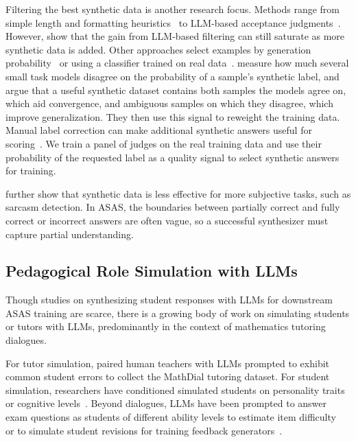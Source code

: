 Filtering the best synthetic data is another research focus. Methods range from simple length and formatting heuristics~\citep{yeZeroGenEfficientZeroshot2022} to LLM-based acceptance judgments~\citep{anikinaRigorousEvaluationLLM2025}. However, \citet{pecherBetterGeneratorsClassifiers2026} show that the gain from LLM-based filtering can still saturate as more synthetic data is added. Other approaches select examples by generation probability~\citep{mengGeneratingTrainingData2022} or using a classifier trained on real data~\citep{anabytavorNotHaveEnough2020}. \citet{zouFuseGenPLMFusion2024} measure how much several small task models disagree on the probability of a sample's synthetic label, and argue that a useful synthetic dataset contains both samples the models agree on, which aid convergence, and ambiguous samples on which they disagree, which improve generalization. They then use this signal to reweight the training data. Manual label correction can make additional synthetic answers useful for scoring~\citep{bexteLunchFreeOvercoming2025}. We train a panel of judges on the real training data and use their probability of the requested label as a quality signal to select synthetic answers for training.

\citet{liSyntheticDataGeneration2023} further show that synthetic data is less effective for more subjective tasks, such as sarcasm detection. In ASAS, the boundaries between partially correct and fully correct or incorrect answers are often vague, so a successful synthesizer must capture partial understanding. 


\subsection{Pedagogical Role Simulation with LLMs} 
Though studies on synthesizing student responses with LLMs for downstream ASAS training are scarce, there is a growing body of work on simulating students or tutors with LLMs, predominantly in the context of mathematics tutoring dialogues.

For tutor simulation, \citet{macinaMathDialDialogueTutoring2023} paired human teachers with LLMs prompted to exhibit common student errors to collect the MathDial tutoring dataset.
For student simulation, researchers have conditioned simulated students on personality traits~\citep{liuPersonalityawareStudentSimulation2025} or cognitive levels~\citep{wuEmbracingImperfectionSimulating2025}.
Beyond dialogues, LLMs have been prompted to answer exam questions as students of different ability levels to estimate item difficulty~\citep{benedettoUsingLLMsSimulate2024} or to simulate student revisions for training feedback generators~\citep{nairClosingLoopLearning2024}.

